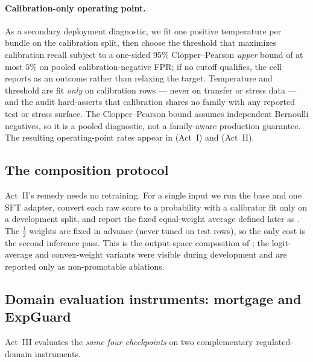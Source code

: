 \paragraph{Calibration-only operating point.} As a secondary deployment diagnostic, we fit one positive
temperature per bundle on the calibration split, then choose the threshold that maximizes calibration
recall subject to a one-sided $95\%$ Clopper--Pearson \emph{upper} bound of at most $5\%$ on pooled
calibration-negative FPR; if no cutoff qualifies, the cell reports  as an
outcome rather than relaxing the target. Temperature and threshold are fit \emph{only} on calibration
rows --- never on transfer or stress data --- and the audit hard-asserts that calibration shares no
family with any reported test or stress surface. The Clopper--Pearson bound assumes independent
Bernoulli negatives, so it is a pooled diagnostic, not a family-aware production guarantee. The
resulting operating-point rates appear in  (Act~I) and 
(Act~II).

\subsection{The composition protocol}
\label{sec:setup-composition}

Act~II's remedy needs no retraining. For a single input we run the base and one SFT adapter, convert
each raw score to a probability with a calibrator fit only on a development split, and report the fixed
equal-weight average defined later as . The $\tfrac12$ weights are fixed in advance (never
tuned on test rows), so the only cost is the second inference pass. This is the output-space composition
of ; the logit-average and convex-weight variants were visible during
development and are reported only as non-promotable ablations.

\subsection{Domain evaluation instruments: mortgage and ExpGuard}
\label{sec:setup-domain}

Act~III evaluates the \emph{same four checkpoints} on two complementary regulated-domain instruments.

